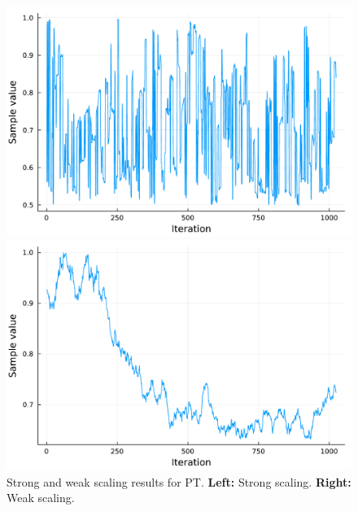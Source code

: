 \begin{figure}[t]
    \centering
    \begin{minipage}{0.45\textwidth}
      \centering
      \includegraphics[width=\textwidth]{../img/trace_density_plots_pt.pdf}
    \end{minipage}
    \begin{minipage}{0.45\textwidth}
      \centering
      \includegraphics[width=\textwidth]{../img/trace_density_plots_single_chain.pdf}
    \end{minipage}
    \caption{
        Strong and weak scaling results for PT.  
        \textbf{Left:} Strong scaling. 
        \textbf{Right:} Weak scaling. 
    }
    \label{fig:PT_scaling}
\end{figure}

